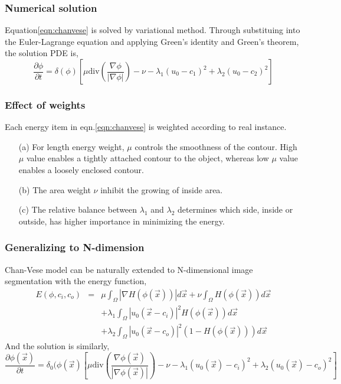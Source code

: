 \subsubsection{Numerical solution}
Equation\ref{eqn:chanvese} is solved by variational method. Through substituing into the Euler-Lagrange equation and applying Green's identity and Green's theorem, the solution PDE is,
\begin{equation}
\frac{\partial \phi}{\partial t} = \delta(\phi)\left[\mu\mbox{div}\left(\frac{\nabla\phi}{|\nabla\phi|}\right)-\nu -\lambda_1(u_0-c_1)^2 + \lambda_2(u_0-c_2)^2\right]
\end{equation}

\subsubsection{Effect of weights}
Each energy item in eqn.\ref{eqn:chanvese} is weighted according to real instance. 
\begin{itemize}
\item[(a)] For length energy weight, $\mu$ controls the smoothness of the contour. High $\mu$ value enables a tightly attached contour to the object, whereas low $\mu$ value enables a loosely enclosed contour. 
\item[(b)] The area weight $\nu$ inhibit the growing of inside area. 
\item[(c)] The relative balance between $\lambda_1$ and $\lambda_2$ determines which side, inside or outside, has higher importance in minimizing the energy. 
\end{itemize}

\subsubsection{Generalizing to N-dimension}
Chan-Vese model can be naturally extended to N-dimensional image segmentation with the energy function,
\begin{eqnarray}
\nonumber
E(\phi, c_i, c_o) & = & \mu\int_\Omega |\nabla H(\phi(\vec{x}))|d\vec{x} + \nu\int_\Omega H(\phi(\vec{x}))d\vec{x}\\
                 &    & + \lambda_1\int_\Omega |u_0(\vec{x} - c_i)|^2H(\phi(\vec{x}))d\vec{x} \\
\nonumber
				 &    & + \lambda_2\int_\Omega |u_0(\vec{x} - c_o)|^2(1 - H(\phi(\vec{x})))d\vec{x}
\end{eqnarray}
And the solution is similarly,
\begin{equation}
\frac{\partial \phi(\vec{x})}{\partial t} = \delta_0(\phi(\vec{x})\left[\mu\mbox{div}\left(\frac{\nabla\phi(\vec{x})}{|\nabla\phi(\vec{x})|}\right)-\nu -\lambda_1(u_0(\vec{x})-c_i)^2 + \lambda_2(u_0(\vec{x})-c_o)^2\right] 
\end{equation}

